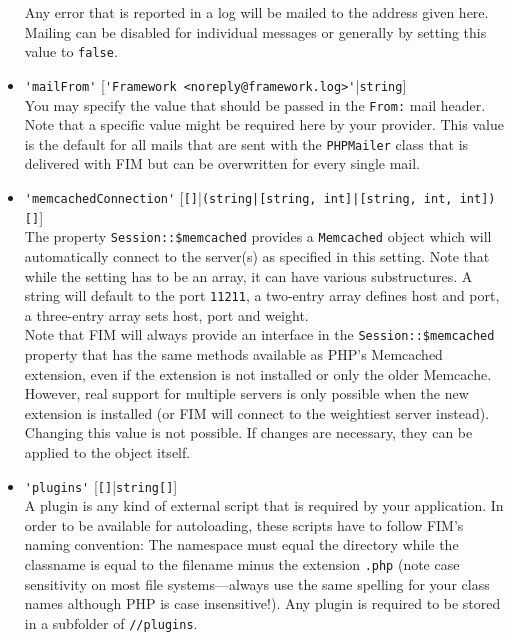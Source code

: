 \documentclass{scrartcl}
\begin{document}
\begin{itemize}
               Any error that is reported in a log will be mailed to the address given here. Mailing can be disabled for individual messages or generally by setting this value to \lstinline!false!.
            \item \lstinline!'mailFrom'! [\lstinline!'Framework <noreply@framework.log>'!|\lstinline!string!] \\
               You may specify the value that should be passed in the \texttt{From:} mail header. Note that a specific value might be required here by your provider. This value is the default for all mails that are sent with the \lstinline!PHPMailer! class that is delivered with FIM but can be overwritten for every single mail.
            \item \lstinline!'memcachedConnection'! [\lstinline![]!|\lstinline!(string|[string, int]|[string, int, int])[]!] \\
               The property \lstinline!Session::$memcached! provides a \lstinline!Memcached! object which will automatically connect to the server(s) as specified in this setting. Note that while the setting has to be an array, it can have various substructures. A string will default to the port \lstinline!11211!, a two-entry array defines host and port, a three-entry array sets host, port and weight. \\
               Note that FIM will always provide an interface in the \lstinline!Session::$memcached! property that has the same methods available as PHP's Memcached extension, even if the extension is not installed or only the older Memcache. However, real support for multiple servers is only possible when the new extension is installed (or FIM will connect to the weightiest server instead). \\
               Changing this value is not possible. If changes are necessary, they can be applied to the object itself.
            \item \lstinline!'plugins'! [\lstinline![]!|\lstinline!string[]!] \\
               A plugin is any kind of external script that is required by your application. In order to be available for autoloading, these scripts have to follow FIM's naming convention: The namespace must equal the directory while the classname is equal to the filename minus the extension \texttt{.php} (note case sensitivity on most file systems---always use the same spelling for your class names although PHP is case insensitive!). Any plugin is required to be stored in a subfolder of \texttt{//plugins}. \\

\end{itemize}
\end{document}
